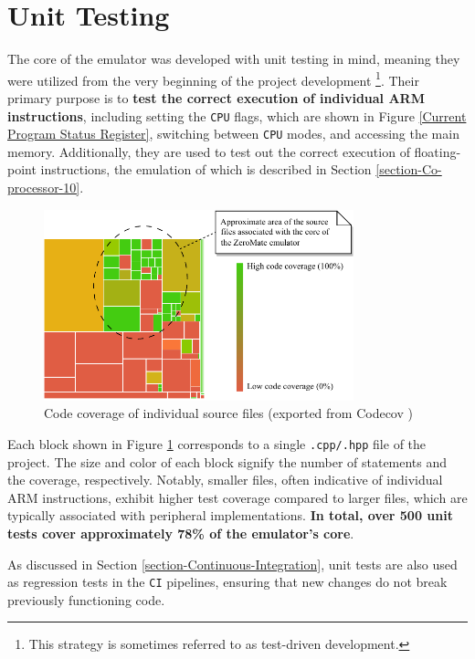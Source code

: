 \documentclass[english, ing, kiv, he, iso690numb, pdf]{fasthesis}
\begin{document}
	\section{Unit Testing}
	
	The core of the emulator was developed with unit testing in mind, meaning they were utilized from the very beginning of the project development \footnote{This strategy is sometimes referred to as test-driven development.}. Their primary purpose is to \textbf{test the correct execution of individual ARM instructions}, including setting the \texttt{CPU} flags, which are shown in Figure \ref{Current Program Status Register}, switching between \texttt{CPU} modes, and accessing the main memory. Additionally, they are used to test out the correct execution of floating-point instructions, the emulation of which is described in Section \ref{section-Co-processor-10}.
	
	\begin{figure}[ht]
		\centering
		\includegraphics[width=0.8\textwidth]{img/diagrams/code_coverage.pdf}
		\caption{Code coverage of individual source files (exported from Codecov \cite{Codecov})}
		\label{Code coverage of individual source files}
	\end{figure}
	
	Each block shown in Figure \ref{Code coverage of individual source files} corresponds to a single \texttt{.cpp/.hpp} file of the project. The size and color of each block signify the number of statements and the coverage, respectively. Notably, smaller files, often indicative of individual ARM instructions, exhibit higher test coverage compared to larger files, which are typically associated with peripheral implementations. \textbf{In total, over 500 unit tests cover approximately 78\% of the emulator's core}.
	
	As discussed in Section \ref{section-Continuous-Integration}, unit tests are also used as regression tests in the \texttt{CI} pipelines, ensuring that new changes do not break previously functioning code.
	
\end{document}

